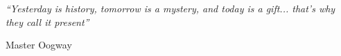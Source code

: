 
\null\vfill
\textit{``Yesterday is history, tomorrow is a mystery, and today is a gift... that’s why they call it present''}

\begin{flushright}
Master Oogway
\end{flushright}

\vfill\vfill\vfill\vfill\vfill\vfill\null
\clearpage  %